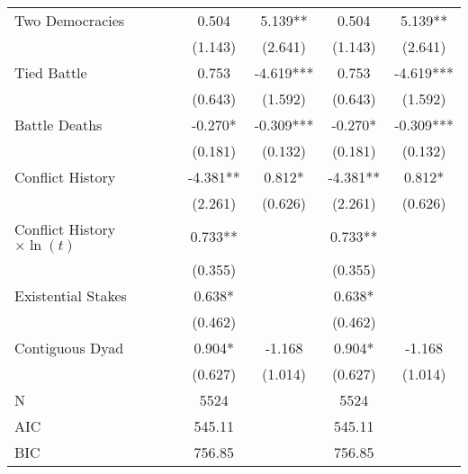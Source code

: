 {\begin{tabular}{l*{4}{c}}
Two Democracies                                             &       0.504   &       5.139** &       0.504   &       5.139** \\
                                                            &     (1.143)   &     (2.641)   &     (1.143)   &     (2.641)   \\
Tied Battle                                                 &       0.753   &      -4.619***&       0.753   &      -4.619***\\
                                                            &     (0.643)   &     (1.592)   &     (0.643)   &     (1.592)   \\
Battle Deaths                                               &      -0.270*  &      -0.309***&      -0.270*  &      -0.309***\\
                                                            &     (0.181)   &     (0.132)   &     (0.181)   &     (0.132)   \\
Conflict History                                            &      -4.381** &       0.812*  &      -4.381** &       0.812*  \\
                                                            &     (2.261)   &     (0.626)   &     (2.261)   &     (0.626)   \\
Conflict History $\times \ln(t)$                            &       0.733** &               &       0.733** &               \\
                                                            &     (0.355)   &               &     (0.355)   &               \\
Existential Stakes                                          &       0.638*  &               &       0.638*  &               \\
                                                            &     (0.462)   &               &     (0.462)   &               \\
Contiguous Dyad                                             &       0.904*  &      -1.168   &       0.904*  &      -1.168   \\
                                                            &     (0.627)   &     (1.014)   &     (0.627)   &     (1.014)   \\
\midrule
N                                                           &        5524   &               &        5524   &               \\
AIC                                                         &      545.11   &               &      545.11   &               \\
BIC                                                         &      756.85   &               &      756.85   &               \\
\bottomrule
\end{tabular}
}
